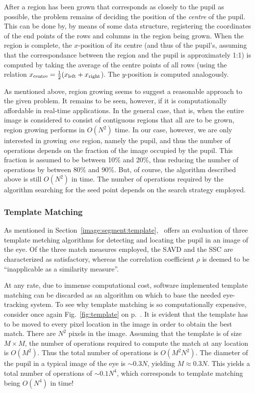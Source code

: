 After a region has been grown that corresponds as closely to the pupil
as possible, the problem remains of deciding the position of the {\em
  centre\/} of the pupil.  This can be done by, by means of some data
structure, registering the coordinates of the end points of the rows
and columns in the region being grown.  When the region is complete,
the $x$-position of its centre (and thus of the pupil's, assuming that
the correspondance between the region and the pupil is approximately
1:1) is computed by taking the average of the centre points of all
rows (using the relation $x_{\mbox{\scriptsize centre}}=\frac{1}{2}
(x_{\mbox{\scriptsize left}}+x_{\mbox{\scriptsize right}}$).  The
$y$-position is computed analogously.

As mentioned above, region growing seems to suggest a reasonable
approach to the given problem.  It remains to be seen, however, if it
is computationally affordable in real-time applications.  In the
general case, that is, when the entire image is considered to consist
of contiguous regions that all are to be grown, region growing
performs in $O(N^{2})$ time.  In our case, however, we are only
interested in growing {\em one\/} region, namely the pupil, and thus
the number of operations depends on the fraction of the image occupied
by the pupil.  This fraction is assumed to be between 10\% and 20\%,
thus reducing the number of operations by between 80\% and 90\%.  But,
of course, the algorithm described above is still $O(N^{2})$ in time.
The number of operations required by the algorithm searching for the
seed point depends on the search strategy employed.

\subsubsection{Template Matching}

As mentioned in Section~\ref{image:segment:template},~\cite{template}
offers an evaluation of three template metching algorithms for
detecting and locating the pupil in an image of the eye.  Of the three
match measures employed, the SAVD and the SSC are characterized as
satisfactory, whereas the correlation coefficient $\rho$ is deemed to
be ``inapplicable as a similarity measure''.

At any rate, due to immense computational cost, software implemented
template matching can be discarded as an algorithm on which to base
the needed eye-tracking system.  To see why template matching is so
computationally expensive, consider once again Fig.~\ref{fig:template}
on p.~\pageref{fig:template}.  It is evident that the template has to
be moved to every pixel location in the image in order to obtain the
best match.  There are $N^{2}$ pixels in the image.  Assuming that the
template is of size $M\times M$, the number of operations required to
compute the match at any location is $O(M^{2})$.  Thus the total
number of operations is $O(M^{2}N^{2})$.  The diameter of the pupil in
a typical image of the eye is $\sim 0.3N$, yielding $M\approx 0.3N$.
This yields a total number of operations of $\sim 0.1N^{4}$, which
corresponds to template matching being $O(N^{4})$ in time!

